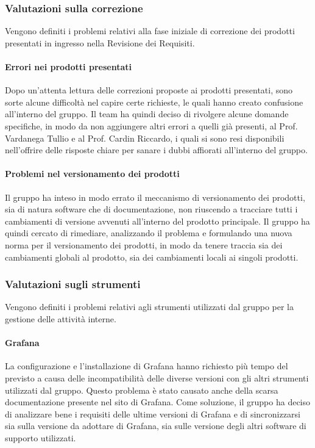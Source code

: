 \documentclass[../piano-di-qualifica.tex]{subfiles}
\begin{document}
\subsubsection{Valutazioni sulla correzione}
\label{sssec:valutazioni_sulla_correzione}
Vengono definiti i problemi relativi alla fase iniziale di correzione dei prodotti presentati in ingresso nella Revisione dei Requisiti.

\paragraph{Errori nei prodotti presentati}
\label{sub:errori_nei_prodotti_presentati}
Dopo un'attenta lettura delle correzioni proposte ai prodotti presentati, sono sorte alcune difficoltà nel capire certe richieste, le quali hanno creato confusione all'interno del gruppo.
Il team ha quindi deciso di rivolgere alcune domande specifiche, in modo da non aggiungere altri errori a quelli già presenti, al Prof. Vardanega Tullio e al Prof. Cardin Riccardo, i quali si sono resi disponibili nell'offrire delle risposte chiare per sanare i dubbi affiorati all'interno del gruppo.

\paragraph{Problemi nel versionamento dei prodotti}
\label{sub:problemi_versionamento_prodotti}
Il gruppo ha inteso in modo errato il meccanismo di versionamento dei prodotti, sia di natura software che di documentazione, non riuscendo a tracciare tutti i cambiamenti di versione avvenuti all'interno del prodotto principale.
Il gruppo ha quindi cercato di rimediare, analizzando il problema e formulando una nuova norma per il versionamento dei prodotti, in modo da tenere traccia sia dei cambiamenti globali al prodotto, sia dei cambiamenti locali ai singoli prodotti.

\subsubsection{Valutazioni sugli strumenti}
\label{sssec:valutazioni_strumenti}
Vengono definiti i problemi relativi agli strumenti utilizzati dal gruppo per la gestione delle attività interne.

\paragraph{Grafana}
\label{sub:grafana}
La configurazione e l'installazione di Grafana hanno richiesto più tempo del previsto a causa delle incompatibilità delle diverse versioni con gli altri strumenti utilizzati dal gruppo. Questo problema è stato causato anche della scarsa documentazione presente nel sito di Grafana.
Come soluzione, il gruppo ha deciso di analizzare bene i requisiti delle ultime versioni di Grafana e di sincronizzarsi sia sulla versione da adottare di Grafana, sia sulle versione degli altri software di supporto utilizzati.
\end{document}
